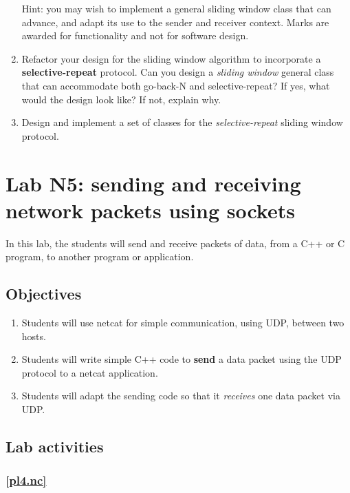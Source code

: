 \documentclass[12pt]{book}
\begin{document}
\begin{enumerate}[label=\arabic*.]
  Hint: you may wish to  implement a general sliding window class that can advance, and adapt its use to the sender and receiver context. Marks are awarded for functionality and not for software design.

\item Refactor your design for the sliding window algorithm to incorporate a \textbf{selective-repeat} protocol. Can you design a \emph{sliding window} general class that can accommodate both go-back-N and selective-repeat? If yes, what would the design look like? If not, explain why.

\item Design and implement a set of classes for the \emph{selective-repeat} sliding window protocol.
\end{enumerate}



\chapter{Lab N5: sending and receiving network packets using sockets}

In this lab, the students will send and receive packets of data, from a C++ or C program, to another program or application.

\section{Objectives}

\begin{enumerate}[label=Objective \arabic*]
\item\label{pl4.nc} Students will use netcat for simple communication, using UDP, between two hosts.
\item\label{pl4.send} Students will write simple C++ code to \textbf{send} a data packet using the UDP protocol to a netcat application.
  \item\label{pl4.recv} Students will adapt the sending code so that it \emph{receives} one data packet via UDP.
\end{enumerate}


\section{Lab activities}

\subsection{\ref{pl4.nc}}
\end{document}

